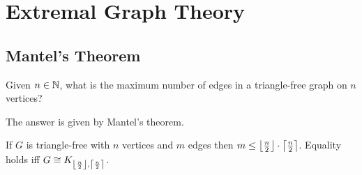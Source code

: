 \documentclass[main.tex]{subfiles}
\begin{document}
\section{Extremal Graph Theory}
\subsection{Mantel's Theorem}
\begin{question*}
  Given $n\in\mathbb N$, what is the maximum number of edges in a triangle-free
  graph on $n$ vertices?
\end{question*}
The answer is given by Mantel's theorem.
\begin{theorem}[Mantel, 1907]
  If $G$ is triangle-free with $n$ vertices and $m$ edges then
  $m\leq\left\lfloor \frac n 2 \right\rfloor\cdot\left\lceil \frac n 2 \right\rceil$.
  Equality holds iff $G\cong K_{\left\lfloor \frac n 2 \right\rfloor,\left\lceil \frac n 2 \right\rceil}$.
\end{theorem}
\end{document}

